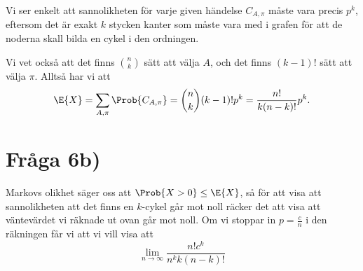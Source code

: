 \documentclass[nobib]{tufte-handout}
\begin{document}
Vi ser enkelt att sannolikheten för varje given händelse $C_{A,\pi}$ måste vara precis $p^k$, eftersom det är exakt $k$ stycken kanter som måste vara med i grafen för att de noderna skall bilda en cykel i den ordningen.

Vi vet också att det finns $n \choose k$ sätt att välja $A$, och det finns $(k-1)!$ sätt att välja $\pi$. Alltså har vi att
$$\E{X} = \sum_{A, \pi} \Prob{C_{A,\pi}} = {n \choose k}(k-1)!p^k = \frac{n!}{k (n-k)!} p^k.$$

\section{Fråga 6b)}

Markovs olikhet säger oss att $\Prob{X > 0} \leq \E{X}$, så för att visa att sannolikheten att det finns en $k$-cykel går mot noll räcker det att visa att väntevärdet vi räknade ut ovan går mot noll. Om vi stoppar in $p = \frac{c}{n}$ i den räkningen får vi att vi vill visa att
$$\lim_{n \to \infty} \frac{n! c^k}{n^k k (n-k)!}$$

%
%
\end{document}

